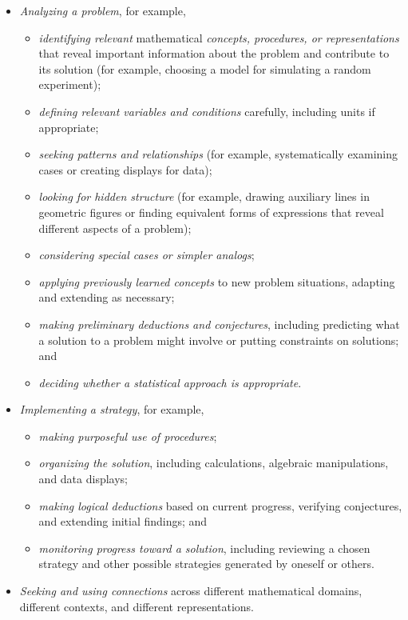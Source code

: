 \documentclass[
  10pt,
  a4paper,
  landscape,
  twoside,
  openany
]{scrbook}
\newcommand{\EN}[1]{#1}
\newcounter{example}
\begin{document}
\TriPara
{
\EN{
\begin{itemize}
  \item  \emph{Analyzing a problem}, for example,
  \begin{itemize}
    \item \emph{identifying relevant} mathematical \emph{concepts, procedures, or representations} that reveal important information about the problem and contribute to its solution (for example, choosing a model for simulating a random experiment);
    \item \emph{defining relevant variables and conditions} carefully, including units if appropriate;
    \item \emph{seeking patterns and relationships} (for example, systematically examining cases or creating displays for data);
    \item \emph{looking for hidden structure} (for example, drawing auxiliary lines in geometric figures or finding equivalent forms of expressions that reveal different aspects of a problem);
    \item \emph{considering special cases or simpler analogs};
    \item \emph{applying previously learned concepts} to new problem situations, adapting and extending as necessary;
    \item \emph{making preliminary deductions and conjectures}, including predicting what a solution to a problem might involve or putting constraints on solutions; and
    \item \emph{deciding whether a statistical approach is appropriate}.
  \end{itemize}
  \item \emph{Implementing a strategy}, for example,
  \begin{itemize}
    \item \emph{making purposeful use of procedures};
    \item \emph{organizing the solution}, including calculations, algebraic manipulations, and data displays;
    \item \emph{making logical deductions} based on current progress, verifying conjectures, and extending initial findings; and
    \item \emph{monitoring progress toward a solution}, including reviewing a chosen strategy and other possible strategies generated by oneself or others.
  \end{itemize}
  \item \emph{Seeking and using connections} across different mathematical domains, different contexts, and different representations.

\end{itemize}}}
\end{document}
